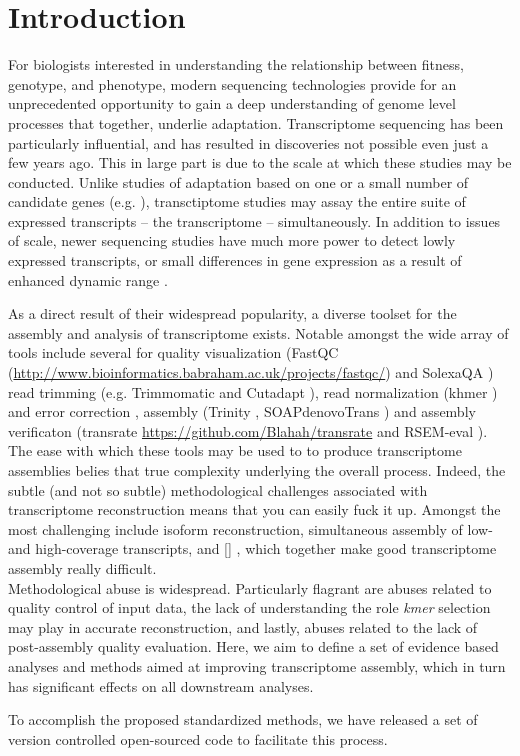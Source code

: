 \section*{Introduction}


For biologists interested in understanding the relationship between fitness, genotype, and phenotype, modern sequencing technologies provide for an unprecedented opportunity to gain a deep understanding of genome level processes that together, underlie adaptation. Transcriptome sequencing has been particularly influential, and has resulted in discoveries not possible even just a few years ago. This in large part is due to the scale at which these studies may be conducted. Unlike studies of adaptation based on one or a small number of candidate genes (e.g. \citep{Fitzpatrick:2005vd,Panhuis:2006kp}), transctiptome studies may assay the entire suite of expressed transcripts -- the transcriptome -- simultaneously. In addition to issues of scale, newer sequencing studies have much more power to detect lowly expressed transcripts, or small differences in gene expression as a result of enhanced dynamic range \citep{Wolf:2013hd,Vijay:2012gy}.

As a direct result of their widespread popularity, a diverse toolset for the assembly and analysis of transcriptome exists. Notable amongst the wide array of tools include several for quality visualization (FastQC (\url{http://www.bioinformatics.babraham.ac.uk/projects/fastqc/}) and SolexaQA \citep{Cox:2010ch}) read trimming (e.g. Trimmomatic \citep{Bolger:2014ek} and Cutadapt \citep{Martin:2011va}), read normalization (khmer \citep{Pell:2012id}) and error correction \citep{Le:2013dy}, assembly (Trinity \citep{Haas:2013jq}, SOAPdenovoTrans \citep{Xie:2013wu}) and assembly verificaton (transrate \url{https://github.com/Blahah/transrate} and RSEM-eval \citep{Li:2014er}). The ease with which these tools may be used to to produce transcriptome assemblies belies that true complexity underlying the overall process. Indeed, the subtle (and not so subtle) methodological challenges associated with transcriptome reconstruction means that you can easily fuck it up. Amongst the most challenging include isoform reconstruction, simultaneous assembly of low- and high-coverage transcripts, and [] \citep{Modrek:2001ud,Johnson:2003kh}, which together make good transcriptome assembly really difficult. \\


Methodological abuse is widespread. Particularly flagrant are abuses related to quality control of input data, the lack of understanding the role \textit{kmer} selection may play in accurate reconstruction, and lastly, abuses related to the lack of post-assembly quality evaluation. Here, we aim to define a set of evidence based analyses and methods aimed at improving transcriptome assembly, which in turn has significant effects on all downstream analyses. 


To accomplish the proposed standardized methods, we have released a set of version controlled open-sourced code to facilitate this process.   
